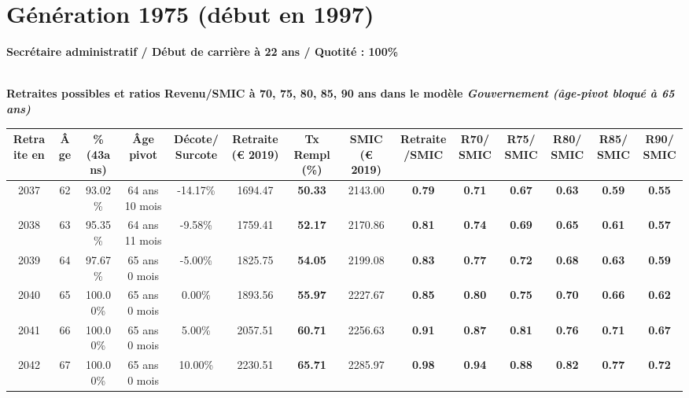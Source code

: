  \newpage 

\section{Génération 1975 (début en 1997)\label{SecretaireAdmin_100_1975_22_0}} 
 
{\bf \noindent Secrétaire administratif / Début de carrière à 22 ans / Quotité : 100\%}  ~ 

 ~\\{\bf \noindent Retraites possibles et ratios Revenu/SMIC à 70, 75, 80, 85, 90 ans dans le modèle \emph{Gouvernement (âge-pivot bloqué à 65 ans)}}  
 
\begin{adjustbox}{max width=\textwidth} 
\begin{tabular}[htb]{|c|c||c|c|c||c|c||c|c||c|c|c|c|c|} 
\hline 
 Retraite en &  Âge &  \%(43ans) &  Âge pivot &  Décote/Surcote &  Retraite (\euro{} 2019) &  Tx Rempl(\%) &  SMIC (\euro{} 2019) &  Retraite/SMIC &  R70/SMIC &  R75/SMIC &  R80/SMIC &  R85/SMIC &  R90/SMIC \\ 
\hline \hline 
 2037 &  62 &  93.02\% &  64 ans 10 mois &  -14.17\% &  1694.47 &  {\bf 50.33} &  2143.00 &  {\bf {\color{red} 0.79}} &  {\bf {\color{red} 0.71}} &  {\bf {\color{red} 0.67}} &  {\bf {\color{red} 0.63}} &  {\bf {\color{red} 0.59}} &  {\bf {\color{red} 0.55}} \\ 
\hline 
 2038 &  63 &  95.35\% &  64 ans 11 mois &  -9.58\% &  1759.41 &  {\bf 52.17} &  2170.86 &  {\bf {\color{red} 0.81}} &  {\bf {\color{red} 0.74}} &  {\bf {\color{red} 0.69}} &  {\bf {\color{red} 0.65}} &  {\bf {\color{red} 0.61}} &  {\bf {\color{red} 0.57}} \\ 
\hline 
 2039 &  64 &  97.67\% &  65 ans 0 mois &  -5.00\% &  1825.75 &  {\bf 54.05} &  2199.08 &  {\bf {\color{red} 0.83}} &  {\bf {\color{red} 0.77}} &  {\bf {\color{red} 0.72}} &  {\bf {\color{red} 0.68}} &  {\bf {\color{red} 0.63}} &  {\bf {\color{red} 0.59}} \\ 
\hline 
 2040 &  65 &  100.00\% &  65 ans 0 mois &  0.00\% &  1893.56 &  {\bf 55.97} &  2227.67 &  {\bf {\color{red} 0.85}} &  {\bf {\color{red} 0.80}} &  {\bf {\color{red} 0.75}} &  {\bf {\color{red} 0.70}} &  {\bf {\color{red} 0.66}} &  {\bf {\color{red} 0.62}} \\ 
\hline 
 2041 &  66 &  100.00\% &  65 ans 0 mois &  5.00\% &  2057.51 &  {\bf 60.71} &  2256.63 &  {\bf {\color{red} 0.91}} &  {\bf {\color{red} 0.87}} &  {\bf {\color{red} 0.81}} &  {\bf {\color{red} 0.76}} &  {\bf {\color{red} 0.71}} &  {\bf {\color{red} 0.67}} \\ 
\hline 
 2042 &  67 &  100.00\% &  65 ans 0 mois &  10.00\% &  2230.51 &  {\bf 65.71} &  2285.97 &  {\bf {\color{red} 0.98}} &  {\bf {\color{red} 0.94}} &  {\bf {\color{red} 0.88}} &  {\bf {\color{red} 0.82}} &  {\bf {\color{red} 0.77}} &  {\bf {\color{red} 0.72}} \\ 
\hline 
\hline 
\end{tabular} 
\end{adjustbox} 
 
